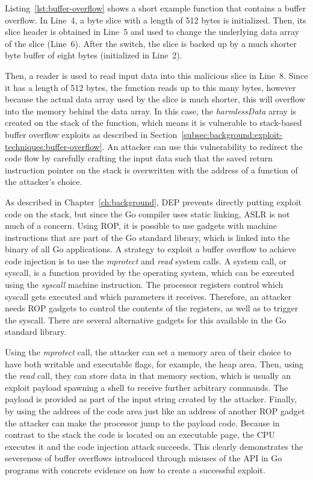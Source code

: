 Listing~\ref{lst:buffer-overflow} shows a short example function that contains a buffer overflow.
In Line~4, a byte slice with a length of 512 bytes is initialized.
Then, its slice header is obtained in Line~5 and used to change the underlying data array of the slice (Line~6).
After the switch, the slice is backed up by a much shorter byte buffer of eight bytes (initialized in Line~2).



Then, a reader is used to read input data into this malicious slice in Line~8.
Since it has a length of 512 bytes, the function reads up to this many bytes, however because the actual data array used
by the slice is much shorter, this will overflow into the memory behind the data array.
In this case, the \textit{harmlessData} array is created on the stack of the function, which means it is vulnerable to
stack-based buffer overflow exploits as described in Section~\ref{subsec:background:exploit-techniques:buffer-overflow}.
An attacker can use this vulnerability to redirect the code flow by carefully crafting the input data such that the
saved return instruction pointer on the stack is overwritten with the address of a function of the attacker's choice.

As described in Chapter~\ref{ch:background}, \acrshort{DEP} prevents directly putting exploit code on the stack, but
since the Go compiler uses static linking, \acrshort{ASLR} is not much of a concern.
Using \acrshort{ROP}, it is possible to use gadgets with machine instructions that are part of the Go standard library,
which is linked into the binary of all Go applications.
A strategy to exploit a buffer overflow to achieve code injection is to use the \textit{mprotect} and \textit{read}
system calls.
A system call, or syscall, is a function provided by the operating system, which can be executed using the
\textit{syscall} machine instruction.
The processor registers control which syscall gets executed and which parameters it receives.
Therefore, an attacker needs \acrshort{ROP} gadgets to control the contents of the registers, as well as to trigger
the syscall.
There are several alternative gadgets for this available in the Go standard library.

Using the \textit{mprotect} call, the attacker can set a memory area of their choice to have both writable and
executable flags, for example, the heap area.
Then, using the \textit{read} call, they can store data in that memory section, which is usually an exploit payload
spawning a shell to receive further arbitrary commands.
The payload is provided as part of the input string created by the attacker.
Finally, by using the address of the code area just like an address of another \acrshort{ROP} gadget the attacker can
make the processor jump to the payload code.
Because in contrast to the stack the code is located on an executable page, the \acrshort{CPU} executes it and the code
injection attack succeeds.
This clearly demonstrates the severeness of buffer overflows introduced through misuses of the \unsafe{} \acrshort{API}
in Go programs with concrete evidence on how to create a successful exploit.

